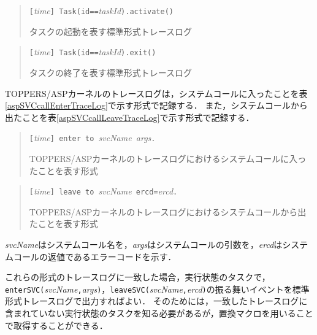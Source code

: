 \begin{table}[p]
\begin{quote}
\begin{breakbox}
{\tt [}{\it time}{\tt ] Task(id==}{\it taskId}{\tt ).activate()}
\end{breakbox}
\caption{タスクの起動を表す標準形式トレースログ}
\label{aspTaskActivateTraceLog}
\end{quote}
\end{table}

\begin{table}[p]
\begin{quote}
\begin{breakbox}
{\tt [}{\it time}{\tt ] Task(id==}{\it taskId}{\tt ).exit()}
\end{breakbox}
\caption{タスクの終了を表す標準形式トレースログ}
\label{aspTaskExitTraceLog}
\end{quote}
\end{table}

TOPPERS/ASPカーネルのトレースログは，システムコールに入ったことを表\ref{aspSVCcallEnterTraceLog}で示す形式で記録する．
また，システムコールから出たことを表\ref{aspSVCcallLeaveTraceLog}で示す形式で記録する．

\begin{table}[p]
\begin{quote}
\begin{breakbox}
{\tt [}{\it time}{\tt ] enter to }{\it svcName}{\tt \ }{\it args}{\tt .}
\end{breakbox}
\caption{TOPPERS/ASPカーネルのトレースログにおけるシステムコールに入ったことを表す形式}
\label{aspSVCcallEnterTraceLog}
\end{quote}
\end{table}

\begin{table}[p]
\begin{quote}
\begin{breakbox}
{\tt [}{\it time}{\tt ] leave to }{\it svcName}{\tt \ ercd=}{\it ercd}{\tt .}
\end{breakbox}
\caption{TOPPERS/ASPカーネルのトレースログにおけるシステムコールから出たことを表す形式}
\label{aspSVCcallLeaveTraceLog}
\end{quote}
\end{table}

{\it svcName}はシステムコール名を，{\it args}はシステムコールの引数を，{\it ercd}はシステムコールの返値であるエラーコードを示す．

これらの形式のトレースログに一致した場合，実行状態のタスクで，{\tt enterSVC(}{\it svcName}{\tt ,}{\it args}{\tt )}，{\tt leaveSVC(}{\it svcName}{\tt ,}{\it ercd}{\tt )}の振る舞いイベントを標準形式トレースログで出力すればよい．
そのためには，一致したトレースログに含まれていない実行状態のタスクを知る必要があるが，置換マクロを用いることで取得することができる．

